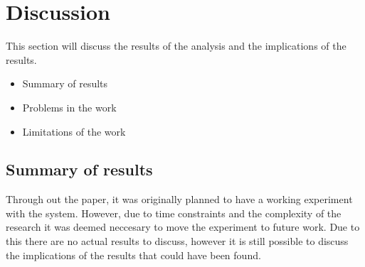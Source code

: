 \section{Discussion}\label{sec:discussion}
This section will discuss the results of the analysis and the implications of the results.

\begin{itemize}
    \item Summary of results
    \item Problems in the work
    \item Limitations of the work
\end{itemize}




\subsection{Summary of results}
Through out the paper, it was originally planned to have a working experiment with the system. However, due to time constraints and the complexity of the research it was deemed neccesary to move the experiment to future work.
Due to this there are no actual results to discuss, however it is still possible to discuss the implications of the results that could have been found.


